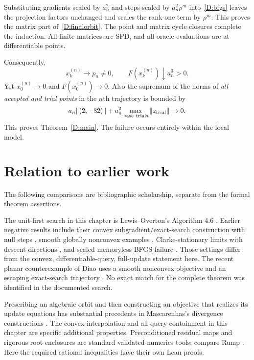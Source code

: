 Substituting gradients scaled by $a_n^2$ and steps scaled by $a_n^2\rho^m$ into~\eqref{D:bfgs} leaves the projection factors unchanged and scales the rank-one term by $\rho^m$. This proves the matrix part of~\eqref{D:finalorbit}. The point and matrix cycle closures complete the induction. All finite matrices are SPD, and all oracle evaluations are at differentiable points.

Consequently,
\[
 x_k^{(n)}\to p_n\ne0,\qquad
 F(x_k^{(n)})\downarrow a_n^3>0.
\]
Yet $x_0^{(n)}\to0$ and $F(x_0^{(n)})\to0$. Also the supremum of the norms of \emph{all accepted and trial points} in the $n$th trajectory is bounded by
\[
 a_n\|(2,-32)\|+a_n^2\max_{\rm base\ trials}\|z_{\rm trial}\|\to0.
\]
This proves Theorem~\ref{D:main}. The failure occurs entirely within the local model.


\endgroup


\section*{Relation to earlier work}
The following comparisons are bibliographic scholarship, separate from the formal theorem assertions.

The unit-first search in this chapter is Lewis--Overton's Algorithm 4.6 \cite{LO}. Earlier negative results include their convex subgradient/exact-search construction with null steps \cite{NEG_LO08}, smooth globally nonconvex examples \cite{NEG_M04,NEG_M07,NEG_M14,NEG_DAI02,NEG_DAI13}, Clarke-stationary limits with descent directions \cite{NEG_LZ15}, and scaled memoryless BFGS failure \cite{NEG_AO21}. Those settings differ from the convex, differentiable-query, full-update statement here. The recent planar counterexample of Diao uses a smooth nonconvex objective and an escaping exact-search trajectory \cite{NEG_DIAO26}. No exact match for the complete theorem was identified in the documented search.

Prescribing an algebraic orbit and then constructing an objective that realizes its update equations has substantial precedents in Mascarenhas's divergence constructions \cite{NEG_M04,NEG_M07,NEG_M14}. The convex interpolation and all-query containment in this chapter are specific additional properties. Preconditioned residual maps and rigorous root enclosures are standard validated-numerics tools; compare Rump \cite[Theorem 13.3]{NEG_RUMP10}. Here the required rational inequalities have their own Lean proofs.
